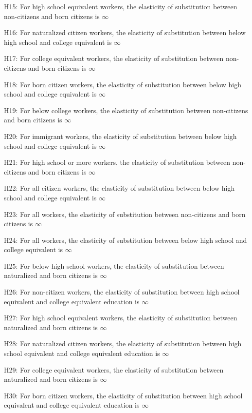 \documentclass[11pt]{article}
\theoremstyle{definition}
\theoremstyle{remark}
\begin{document}
{H15: For high school equivalent workers, the elasticity of substitution between non-citizens and born citizens is $\infty$

H16: For naturalized citizen workers, the elasticity of substitution between below high school and college equivalent is $\infty$

H17: For college equivalent workers, the elasticity of substitution between non-citizens and born citizens is $\infty$

H18: For born citizen workers, the elasticity of substitution between below high school and college equivalent is $\infty$

H19: For below college workers, the elasticity of substitution between non-citizens and born citizens is $\infty$

H20: For immigrant workers, the elasticity of substitution between below high school and college equivalent is $\infty$

H21: For high school or more workers, the elasticity of substitution between non-citizens and born citizens is $\infty$

H22: For all citizen workers, the elasticity of substitution between below high school and college equivalent is $\infty$

H23: For all workers, the elasticity of substitution between non-citizens and born citizens is $\infty$

H24: For all workers, the elasticity of substitution between below high school and college equivalent is $\infty$

H25: For below high school workers, the elasticity of substitution between naturalized and born citizens is $\infty$

H26: For non-citizen workers, the elasticity of substitution between high school equivalent and college equivalent education is $\infty$

H27: For high school equivalent workers, the elasticity of substitution between naturalized and born citizens is $\infty$

H28: For naturalized citizen workers, the elasticity of substitution between high school equivalent and college equivalent education is $\infty$

H29: For college equivalent workers, the elasticity of substitution between naturalized and born citizens is $\infty$

H30: For born citizen workers, the elasticity of substitution between high school equivalent and college equivalent education is $\infty$

}
\end{document}
